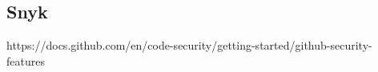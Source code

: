 \subsection{Snyk} \label{sec:Snyk}
https://docs.github.com/en/code-security/getting-started/github-security-features